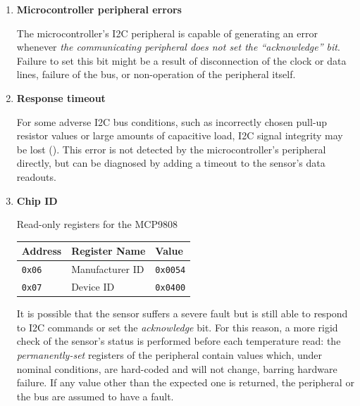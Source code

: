 \documentclass[a4paper,nobib]{tufte-book}
\begin{document}
\begin{enumerate}
	\item \textbf{Microcontroller peripheral errors}
	
	The microcontroller's \ac{I2C} peripheral is capable of generating an error whenever \emph{the communicating peripheral does not set the ``acknowledge'' bit}. Failure to set this bit might be a result of disconnection of the clock or data lines, failure of the bus, or non-operation of the peripheral itself.
	
	\item \textbf{Response timeout}
	
	For some adverse \ac{I2C} bus conditions, such as incorrectly chosen pull-up resistor values or large amounts of capacitive load, \ac{I2C} signal integrity may be lost (). This error is not detected by the microcontroller's peripheral directly, but can be diagnosed by adding a timeout to the sensor's data readouts.
	
	\item \textbf{Chip ID}
	
	\begin{margintable}
		\centering
		\caption{Read-only registers for the MCP9808}
		\label{tab:mcp9808readonly}
		\begin{tabularx}{\linewidth}{@{}lXl@{}}
			\toprule
			Address & Register Name & Value \\ \midrule
			\texttt{0x06} & Manufacturer ID & \texttt{0x0054} \\
			\texttt{0x07} & Device ID & \texttt{0x0400} \\ \bottomrule
		\end{tabularx}
	\end{margintable}
	
	It is possible that the sensor suffers a severe fault but is still able to respond to \ac{I2C} commands or set the \emph{acknowledge} bit. For this reason, a more rigid check of the sensor's status is performed before each temperature read: the \emph{permanently-set} registers of the peripheral contain values which, under nominal conditions, are hard-coded and will not change, barring hardware failure. If any value other than the expected one is returned, the peripheral or the bus are assumed to have a fault.
\end{enumerate}
\end{document}
